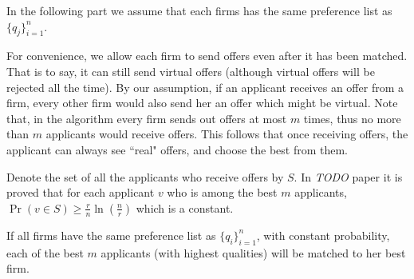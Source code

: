 In the following part we assume that each firms has the same preference
list as $\{q_j\}_{i=1}^{n}$.

For convenience, we allow each firm to send offers even after it has been matched.
That is to say, it can still send virtual offers
(although virtual offers will be rejected all the time).
By our assumption, if an applicant receives an offer from a firm, every other firm would also send her
 an offer which might be virtual.
 Note that, in the algorithm every firm sends out offers at most $m$ times, thus no more than $m$ applicants would receive offers. This follows that once receiving offers, the applicant can always see ``real" offers, and choose the best from them.

Denote the set of all the applicants who receive offers by $S$. In \emph{TODO} paper it is
proved
that for each applicant $v$ who is among the best $m$ applicants,
$\Pr(v \in S) \ge \frac{r}{n} \ln (\frac{n}{r})$ which
is a constant.

\begin{lemma} \label{finallem}
    If all firms have the same preference list as $\{q_i\}_{i=1}^{n}$,
    with constant probability,
    each of the best $m$ applicants (with highest qualities) will be matched to her best firm.
\end{lemma}

